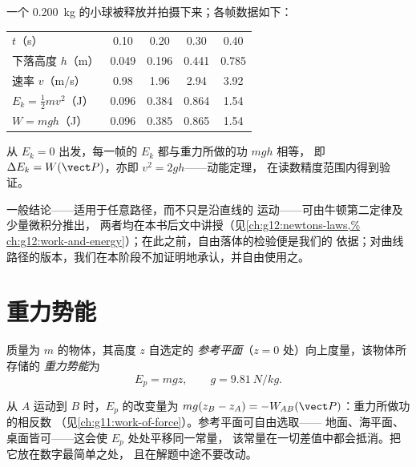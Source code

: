 \begin{example}\label{ex:g11:mechanical-energy:freefall}
一个 \qty{0.200}{kg} 的小球被释放并拍摄下来；各帧数据如下：
\begin{center}\small
\begin{tabular}{lcccc}
$t$（\unit{s}）& 0.10 & 0.20 & 0.30 & 0.40\\
下落高度 $h$（\unit{m}）& 0.049 & 0.196 & 0.441 & 0.785\\
速率 $v$（\unit{m/s}）& 0.98 & 1.96 & 2.94 & 3.92\\
$E_k = \tfrac12 mv^2$（\unit{J}）& 0.096 & 0.384 & 0.864 & 1.54\\
$W = mgh$（\unit{J}）& 0.096 & 0.385 & 0.865 & 1.54
\end{tabular}
\end{center}
从 $E_k = 0$ 出发，每一帧的 $E_k$ 都与重力所做的功 $mgh$ 相等，
即 $\Delta E_k = W(\vect P)$，亦即 $v^2 = 2gh$——动能定理，
在读数精度范围内得到验证。
\end{example}

\begin{remark}[证明的出处]\label{rem:g11:mechanical-energy:proof}
一般结论——适用于任意路径，而不只是沿直线的
运动——可由牛顿第二定律及少量微积分推出，
两者均在本书后文中讲授（见\cref{ch:g12:newtons-laws,%
ch:g12:work-and-energy}）；在此之前，自由落体的检验便是我们的
依据；对曲线路径的版本，我们在本阶段不加证明地承认，并自由使用之。
\end{remark}

\section{重力势能}

\begin{definition}[重力势能]\label{def:g11:mechanical-energy:potential}
质量为 $m$ 的物体，其高度 $z$ 自选定的
\emph{参考平面}（$z = 0$ 处）向上度量，该物体所存储的
\emph{重力势能}为
\[
E_p = m g z, \qquad g = \qty{9.81}{N/kg}.
\]
\end{definition}

\begin{remark}[只有差值有意义]\label{rem:g11:mechanical-energy:reference}
从 $A$ 运动到 $B$ 时，$E_p$ 的改变量为 $mg(z_B - z_A) =
-W_{AB}(\vect P)$：重力所做功的相反数
（见\cref{ch:g11:work-of-force}）。参考平面可自由选取——
地面、海平面、桌面皆可——这会使 $E_p$ 处处平移同一常量，
该常量在一切差值中都会抵消。把它放在数字最简单之处，
且在解题中途不要改动。
\end{remark}

